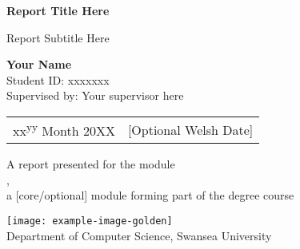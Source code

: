 \begin{titlepage}
  \begin{center}
    \vspace*{1cm}

    \LARGE
    \textbf{Report Title Here}

    \vspace{0.5cm}
    \Large
    Report Subtitle Here

    \vspace{1.5cm}

    \Large
    \textbf{Your Name}\\
    \vspace{0.5cm}
    \normalsize
    Student ID: xxxxxxx\\
    \vspace{0.5cm}
    \large
    Supervised by: Your supervisor here
    \begin{table}[h]
      \centering
      \begin{tabular}{l|l}
        \arrayrulecolor{swanblue}
        \large xx\textsuperscript{yy} Month 20XX & \large [Optional Welsh Date]
      \end{tabular}
    \end{table}

    \vfill
    \large
    A report presented for the module\\
    ,\\
    a [core/optional] module forming part of the degree course\\

    \vspace{0.8cm}

    \texttt{[image: example-image-golden]}\\
    \vspace{1cm}
    Department of Computer Science, Swansea University

  \end{center}

\end{titlepage}